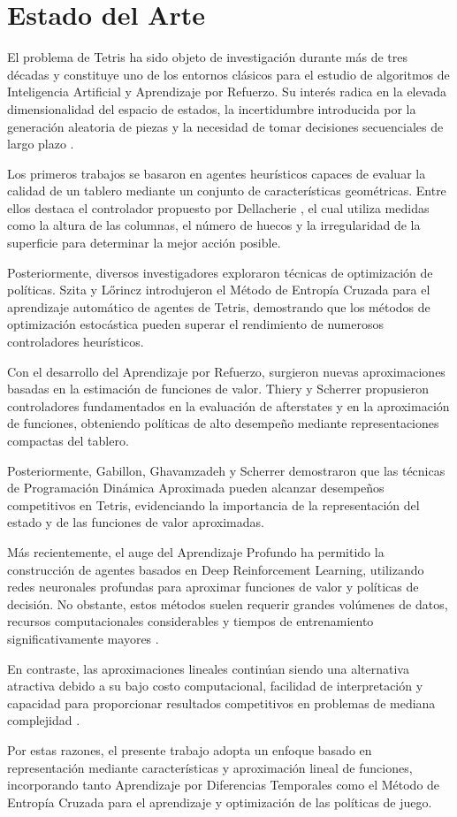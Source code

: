 \section{Estado del Arte}

El problema de Tetris ha sido objeto de investigación durante más de tres décadas y constituye uno de los entornos clásicos para el estudio de algoritmos de Inteligencia Artificial y Aprendizaje por Refuerzo. Su interés radica en la elevada dimensionalidad del espacio de estados, la incertidumbre introducida por la generación aleatoria de piezas y la necesidad de tomar decisiones secuenciales de largo plazo \citep{russell2021,sutton2018}.

Los primeros trabajos se basaron en agentes heurísticos capaces de evaluar la calidad de un tablero mediante un conjunto de características geométricas. Entre ellos destaca el controlador propuesto por Dellacherie \citeyearpar{dellacherie2003}, el cual utiliza medidas como la altura de las columnas, el número de huecos y la irregularidad de la superficie para determinar la mejor acción posible.

Posteriormente, diversos investigadores exploraron técnicas de optimización de políticas. Szita y Lőrincz \citeyearpar{szita2006} introdujeron el Método de Entropía Cruzada para el aprendizaje automático de agentes de Tetris, demostrando que los métodos de optimización estocástica pueden superar el rendimiento de numerosos controladores heurísticos.

Con el desarrollo del Aprendizaje por Refuerzo, surgieron nuevas aproximaciones basadas en la estimación de funciones de valor. Thiery y Scherrer \citeyearpar{thiery2009} propusieron controladores fundamentados en la evaluación de afterstates y en la aproximación de funciones, obteniendo políticas de alto desempeño mediante representaciones compactas del tablero.

Posteriormente, Gabillon, Ghavamzadeh y Scherrer \citeyearpar{gabillon2013} demostraron que las técnicas de Programación Dinámica Aproximada pueden alcanzar desempeños competitivos en Tetris, evidenciando la importancia de la representación del estado y de las funciones de valor aproximadas.

Más recientemente, el auge del Aprendizaje Profundo ha permitido la construcción de agentes basados en Deep Reinforcement Learning, utilizando redes neuronales profundas para aproximar funciones de valor y políticas de decisión. No obstante, estos métodos suelen requerir grandes volúmenes de datos, recursos computacionales considerables y tiempos de entrenamiento significativamente mayores \citep{goodfellow2016,sutton2018}.

En contraste, las aproximaciones lineales continúan siendo una alternativa atractiva debido a su bajo costo computacional, facilidad de interpretación y capacidad para proporcionar resultados competitivos en problemas de mediana complejidad \citep{thiery2009}.

Por estas razones, el presente trabajo adopta un enfoque basado en representación mediante características y aproximación lineal de funciones, incorporando tanto Aprendizaje por Diferencias Temporales como el Método de Entropía Cruzada para el aprendizaje y optimización de las políticas de juego.